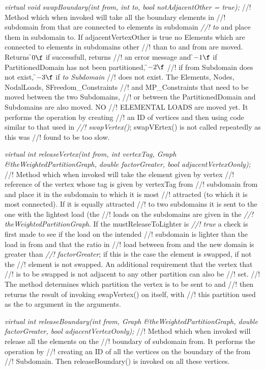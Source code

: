 {\em virtual void swapBoundary(int from, int to, bool notAdjacentOther
= true); } 
//! Method which when invoked will take all the boundary elements in
//! subdomain \p from that are connected to elements in subdomain {\em
//! to} and place them in subdomain \p to. If \p adjacentVertexOther is
\p true no Elements which are connected to elements in subdomains other 
//! than \p to and \p from are moved. Returns \f$0\f$ if successfull, returns 
//! an error message and \f$-1\f$ if PartitionedDomain has not been partitioned, \f$-2\f$ 
//! if \p from Subdomain does not exist, \f$-3\f$ if {\em to Subdomain}
//! does not exist. The Elements, Nodes, NodalLoads, SFreedom\_Constraints
//! and MP\_Constraints that need to be moved between the two Subdomains,
//! or between the PartitionedDomain and Subdomains are also moved. NO
//! ELEMENTAL LOADS are moved yet. It performs the operation by creating
//! an ID of vertices and then using code similar to that used in {\em
//! swapVertex()}; swapVErtex() is not called repeatedly as this was
//! found to be too slow. 

{\em virtual int releaseVertex(int from,
\indent\indent\indent\indent\indent int vertexTag,
\indent\indent\indent\indent\indent Graph \&theWeightedPartitionGraph,
\indent\indent\indent\indent\indent double factorGreater,
\indent\indent\indent\indent\indent bool adjacentVertexOonly); }
//! Method which when invoked will take the element given by vertex
//! reference of the vertex whose tag is given by \p vertexTag from
//! subdomain \p from and place it in the subdomain to which it is most
//! attracted (to which it is most connected). If it is equally attracted
//! to two subdomains it is sent to the one with the lightest load (the
//! loads on the subdomains are given in the {\em
//! theWeightedPartitionGraph}. If the \p mustReleaseToLighter is {\em
//! true} a check is first made to see if the load on the intended
//! subdomain is lighter than the load in \p from and that the ratio in
//! load between from and the new domain is greater than {\em
//! factorGreater}; if this is the case the element is swapped, if not the
//! element is not swapped. An additional requirement that the vertex that
//! is to be swapped is not adjacent to any other partition can also be
//! set. 
//! The method determines which partition the vertex is to be sent to and
//! then returns the result of invoking swapVertex() on itself, with
//! this partition used as the \p to argument in the arguments.

{\em virtual int releaseBoundary(int from,
\indent\indent\indent\indent\indent Graph \&theWeightedPartitionGraph,
\indent\indent\indent\indent\indent double factorGreater,
\indent\indent\indent\indent\indent bool adjacentVertexOonly); }
//! Method which when invoked will release all the elements on the
//! boundary of subdomain \p from. It performs the operation by
//! creating an ID of all the vertices on the boundary of the \p from
//! Subdomain. Then releaseBoundary() is invoked on all these vertices.


